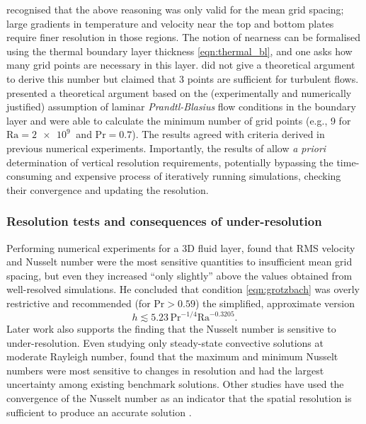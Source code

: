\documentclass[titlepage]{article}
\numberwithin{equation}{section}
\newcommand{\prandtl}{\ensuremath{\mathrm{Pr}}}
\newcommand{\rayleigh}{\ensuremath{\mathrm{Ra}}}
\begin{document}
\citeauthor{grotzbach1983} recognised that the above reasoning was only valid
for the mean grid spacing; large gradients in temperature and velocity near the
top and bottom plates require finer resolution in those regions. The notion of
nearness can be formalised using the thermal boundary layer thickness
\cref{eqn:thermal_bl}, and one asks how many grid points are necessary in this
layer. \citeauthor{grotzbach1983} did not give a theoretical argument to derive
this number but claimed that 3 points are sufficient for turbulent flows.
\textcite{shishkina2010} presented a theoretical argument based on the
(experimentally and numerically justified) assumption of laminar
\emph{Prandtl-Blasius} flow conditions in the boundary layer and were able to
calculate the minimum number of grid points (e.g., 9 for $\rayleigh =
\SI{2e9}{}$ and $\prandtl = 0.7$). The results agreed with criteria derived in
previous numerical experiments. Importantly, the results of
\citeauthor{shishkina2010} allow \emph{a priori} determination of vertical
resolution requirements, potentially bypassing the time-consuming and expensive
process of iteratively running simulations, checking their convergence and
updating the resolution.

\subsubsection{Resolution tests and consequences of under-resolution}%
\label{sec:res_tests}

Performing numerical experiments for a 3D fluid layer,
\citeauthor{grotzbach1983} found that RMS velocity and Nusselt number were
the most sensitive quantities to insufficient mean grid spacing, but even
they increased ``only slightly'' above the values obtained from well-resolved
simulations. He concluded that condition \cref{eqn:grotzbach} was overly
restrictive and recommended (for $\prandtl > 0.59$) the simplified,
approximate version
\[ %
    h \lesssim 5.23 \, \prandtl^{-1/4} \rayleigh^{-0.3205}.
\]
Later work also supports the finding that the Nusselt number is
sensitive to under-resolution. Even studying only steady-state convective
solutions at moderate Rayleigh number, \textcite{le_quere1991} found that the
maximum and minimum Nusselt numbers were most sensitive to changes in
resolution and had the largest uncertainty among existing benchmark solutions.
Other studies have used the convergence of the Nusselt number as an indicator
that the spatial resolution is sufficient to produce an accurate solution
\parencite{ouertatani2008}.
\end{document}

